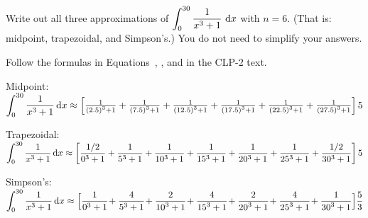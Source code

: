 \subsection*{\Procedural}
\begin{Mquestion}\label{prob_s1.11_int1}
Write out all three approximations of $\displaystyle\int_0^{30} \frac{1}{x^3+1}~\mathrm{d}x$ with $n=6$. (That is: midpoint, trapezoidal, and Simpson's.) You do not need to simplify your answers.
\end{Mquestion}
\begin{hint}
Follow the formulas in Equations~,
, and  in the CLP-2 text.
\end{hint}
\begin{answer}

Midpoint:\\[10pt]
$\displaystyle
\int_0^{30} \frac{1}{x^3+1}\,\mathrm{d}x\approx\left[\tfrac{1}{\left(2.5\right)^3+1}
+\tfrac{1}{\left(7.5\right)^3+1}
+\tfrac{1}{\left(12.5\right)^3+1}
+\tfrac{1}{\left(17.5\right)^3+1}
+\tfrac{1}{\left(22.5\right)^3+1}
+\tfrac{1}{\left(27.5\right)^3+1}
\right]5
$

Trapezoidal:\\[10pt]
$\displaystyle\int_0^{30} \frac{1}{x^3+1}\,\mathrm{d}x
\approx\left[
\frac{1/2}{0^3+1}+
\frac{1}{5^3+1}+
\frac{1}{10^3+1}+
\frac{1}{15^3+1}+
\frac{1}{20^3+1}+
\frac{1}{25^3+1}+
\frac{1/2}{30^3+1}
\right]5$

Simpson's:\\[10pt]
$
\displaystyle\int_0^{30} \frac{1}{x^3+1}\,\mathrm{d}x\approx
\Big[\frac{1}{{0}^3+1}\!+\frac{4}{{5}^3+1}\!+\frac{2}{{10}^3+1}\!+\frac{4}{{15}^3+1}\!+\frac{2}{{20}^3+1}\!+\frac{4}{{25}^3+1}\!+ \frac{1}{{30}^3+1}\Big]\frac{5}{3}
$
\end{answer}
